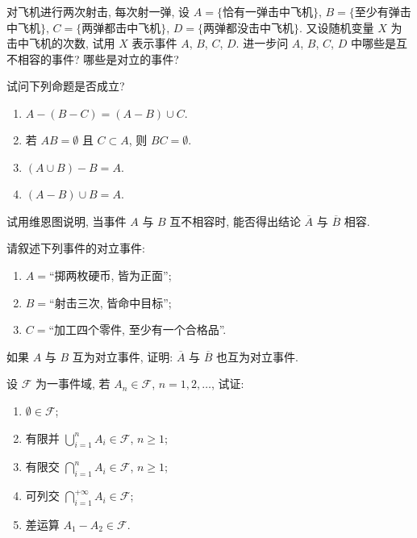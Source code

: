 \begin{xiti}
  \item 对飞机进行两次射击, 每次射一弹, 设 $A = \{$恰有一弹击中飞机$\}$, $B = \{$至少有弹击中飞机$\}$, $C = \{$两弹都击中飞机$\}$, $D = \{$两弹都没击中飞机$\}$. 又设随机变量 $X$ 为击中飞机的次数, 试用 $X$ 表示事件 $A$, $B$, $C$, $D$. 进一步问 $A$, $B$, $C$, $D$ 中哪些是互不相容的事件? 哪些是对立的事件?

  \item 试问下列命题是否成立?
  \begin{enumerate}
    \item $ A - (B - C) = (A - B) \cup C.$
    \item 若 $AB = \emptyset$ 且 $ C \subset A$, 则 $BC = \emptyset$.
    \item $(A \cup B) - B = A$.
    \item $(A - B) \cup B = A$.
  \end{enumerate}

  \item 试用维恩图说明, 当事件 $A$ 与 $B$ 互不相容时, 能否得出结论 $\overline{A}$ 与 $\overline{B}$ 相容.

  \item 请叙述下列事件的对立事件:
  \begin{enumerate}
    \item $A = $“掷两枚硬币, 皆为正面”;
    \item $B = $“射击三次, 皆命中目标”;
    \item $C = $“加工四个零件, 至少有一个合格品”.
  \end{enumerate}

  \item 如果 $A$ 与 $B$ 互为对立事件, 证明: $\overline{A}$ 与 $\overline{B}$ 也互为对立事件.

  \item 设 $\mathscr{F}$ 为一事件域, 若 $A_n \in \mathscr{F}$, $n = 1,2, \dotsc$, 试证:
  \begin{enumerate}
    \item $\emptyset \in \mathscr{F}$;
    \item 有限并 $\bigcup _{i=1}^n A_i \in \mathscr{F}$, $n \ge 1$;
    \item 有限交 $\bigcap _{i=1}^n A_i \in \mathscr{F}$, $n \ge 1$;
    \item 可列交 $\bigcap _{i=1}^{+\infty} A_i \in \mathscr{F}$;
    \item 差运算 $A_1 - A_2 \in \mathscr{F}$.
  \end{enumerate}
\end{xiti}

